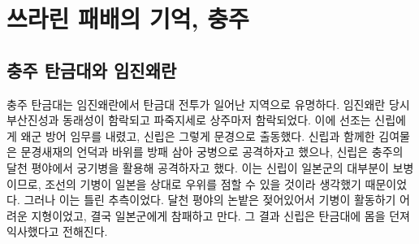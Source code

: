 \section{쓰라린 패배의 기억, 충주}
\subsection{충주 탄금대와 임진왜란}
충주 탄금대는 임진왜란에서 탄금대 전투가 일어난 지역으로 유명하다. 임진왜란 당시 부산진성과 동래성이 함락되고 파죽지세로 상주마저 함락되었다. 이에 선조는 신립에게 왜군 방어 임무를 내렸고, 신립은 그렇게 문경으로 출동했다. 신립과 함께한 김여물은 문경새재의 언덕과 바위를 방패 삼아 궁병으로 공격하자고 했으나, 신립은 충주의 달천 평야에서 궁기병을 활용해 공격하자고 했다. 이는 신립이 일본군의 대부분이 보병이므로, 조선의 기병이 일본을 상대로 우위를 점할 수 있을 것이라 생각했기 때문이었다. 그러나 이는 틀린 추측이었다. 달천 평야의 논밭은 젖어있어서 기병이 활동하기 어려운 지형이었고, 결국 일본군에게 참패하고 만다. 그 결과 신립은 탄금대에 몸을 던져 익사했다고 전해진다. 
